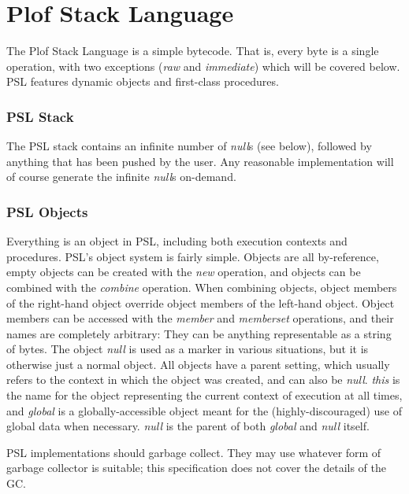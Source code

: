 \part{Plof Stack Language}

The Plof Stack Language is a simple bytecode. That is, every byte is a single operation, with two exceptions (\textit{raw} and \textit{immediate}) which will be covered below. PSL features dynamic objects and first-class procedures.



\section{PSL Stack}

The PSL stack contains an infinite number of \textit{null}s (see below), followed by anything that has been pushed by the user. Any reasonable implementation will of course generate the infinite \textit{null}s on-demand.



\section{PSL Objects}

Everything is an object in PSL, including both execution contexts and procedures. PSL's object system is fairly simple. Objects are all by-reference, empty objects can be created with the \textit{new} operation, and objects can be combined with the \textit{combine} operation. When combining objects, object members of the right-hand object override object members of the left-hand object. Object members can be accessed with the \textit{member} and \textit{memberset} operations, and their names are completely arbitrary: They can be anything representable as a string of bytes. The object \textit{null }is used as a marker in various situations, but it is otherwise just a normal object. All objects have a parent setting, which usually refers to the context in which the object was created, and can also be \textit{null}. \textit{this} is the name for the object representing the current context of execution at all times, and \textit{global} is a globally-accessible object meant for the (highly-discouraged) use of global data when necessary. \textit{null} is the parent of both \textit{global} and \textit{null} itself.

PSL implementations should garbage collect. They may use whatever form of garbage collector is suitable; this specification does not cover the details of the GC.



